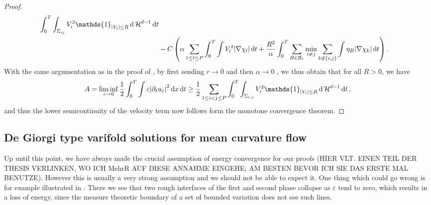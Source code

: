 \begin{proof}
\begin{align*}
			\int_{ 0 }^{ T }
				\int_{ \Sigma_{ i j } }
					V_{ i }^{ 2 } \mathds{ 1 }_{ \abs{ V_{ i } } \leq R }
				\dd{ \hm^{ d - 1 } }
			\dd{ t }
		\\
		& -
		C \left(
			\alpha \sum_{ 1 \leq l \leq P }
				\int_{ 0 }^{ T }
					\int
						V_{ l }^{ 2 }
					\abs{ \nabla \chi_{ l } }
				\dd{ t }
			+
			\frac{ R^{ 2 } }{ \alpha }
			\int_{ 0 }^{ T }
				\sum_{ B \in \mathcal{ B }_{ r } }
					\min_{ i \neq j }
						\sum_{ k \notin \{ i , j \} }
							\int
								\eta_{ B }
							\abs{ \nabla \chi_{ k } }
			\dd{ t }
		\right).
	\end{align*}
	With the same argumentation as in the proof of 
	, by first sending $ r \to 0 $ and then 
	$ \alpha \to 0$ , we thus obtain that for all $R > 0 $, we have
	\begin{equation*}
		A = \liminf_{ \varepsilon \to 0 } \frac{ 1 }{ 2 }
		\int_{ 0 }^{ T }
			\int
				\varepsilon \abs{ \partial_{ t } u_{ \varepsilon } }^{ 2 }
			\dd{ x }
		\dd{ t }
		\geq
		\frac{ 1 }{ 2 }
		\sum_{ 1 \leq i < j \leq P }
			\int_{ 0 }^{ T }
				\int_{ \Sigma_{ i , j } }
					V_{ i }^{ 2 }
					\mathds{ 1 }_{ \abs{ V_{ i } } \leq R }
				\dd{ \hm^{ d - 1 } }
			\dd{ t },
	\end{equation*}
	and thus the lower semicontinuity of the velocity term now follows form the 
	monotone convergence theorem.
\end{proof}

\subsection{De Giorgi type varifold solutions for mean curvature flow}

Up until this point, we have always made the crucial assumption of energy 
convergence for our proofs (HIER VLT. EINEN TEIL DER THESIS VERLINKEN, WO ICH 
MehrR AUF DIESE ANNAHME EINGEHE; AM BESTEN BEVOR ICH SIE DAS ERSTE MAL BENUTZE).
However this is usually a very strong assumption and we should not be able to 
expect it. One thing which could go wrong is for example illustrated in 
. There we see that two rough interfaces of 
the first and second phase collapse as $ \varepsilon $ tend to zero, which 
results in a loss of energy, since the measure theoretic boundary of a set of 
bounded variation does not see such lines.

